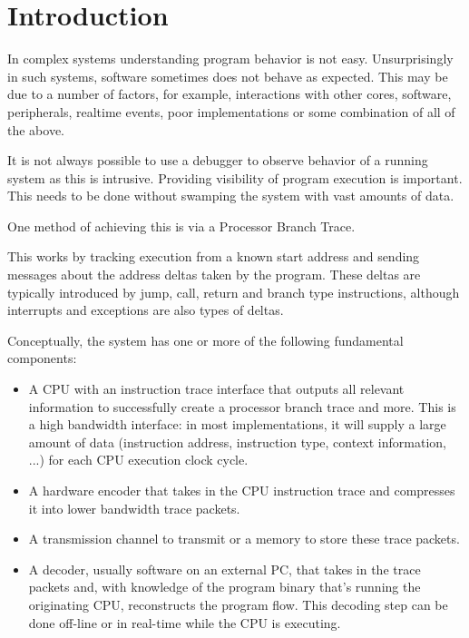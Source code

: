 \chapter{Introduction}
\label{sec:intro}

In complex systems understanding program behavior is not easy.
Unsurprisingly in such systems, software sometimes does not behave as
expected. This may be due to a number of factors, for example,
interactions with other cores, software, peripherals, realtime
events, poor implementations or some combination of all of the above.

It is not always possible to use a debugger to observe behavior of a
running system as this is intrusive.  Providing visibility of program
execution is important.  This needs to be done without swamping the
system with vast amounts of data.

One method of achieving this is via a Processor Branch Trace.

This works by tracking execution from a known start address and sending
messages about the address deltas taken by the program. These deltas are
typically introduced by jump, call, return and branch type instructions,
although interrupts and exceptions are also types of deltas.

Conceptually, the system has one or more of the following fundamental components:

\begin{itemize}
  \item
    A CPU with an instruction trace interface that outputs all relevant
    information to successfully create a processor branch trace and more.
    This is a high bandwidth interface: in most implementations, it will supply
    a large amount of data (instruction address, instruction type, context information, ...)
    for each CPU execution clock cycle.
  \item
    A hardware encoder that takes in the CPU instruction trace and compresses
    it into lower bandwidth trace packets.
  \item
    A transmission channel to transmit or a memory to store these trace packets.
  \item
    A decoder, usually software on an external PC, that takes in the trace
    packets and, with knowledge of the program binary that's running the
    originating CPU, reconstructs the program flow. This decoding step can
    be done off-line or in real-time while the CPU is executing.
\end{itemize}

